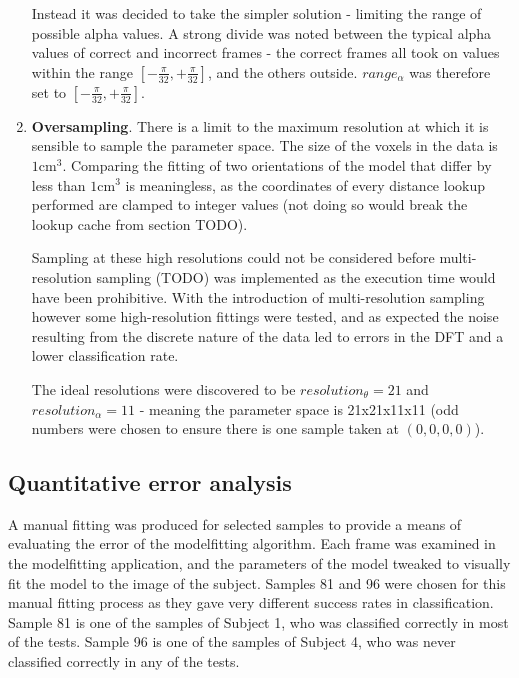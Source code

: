\begin{enumerate}
		Instead it was decided to take the simpler solution - limiting the range of possible alpha values.
		A strong divide was noted between the typical alpha values of correct and incorrect frames - the correct frames all took on
		values within the range $\left[ -\frac{\pi}{32}, +\frac{\pi}{32}\right]$, and the others outside.
		$range_\alpha$ was therefore set to $\left[ -\frac{\pi}{32}, +\frac{\pi}{32}\right]$.
	
	\item \textbf{Oversampling}.
		There is a limit to the maximum resolution at which it is sensible to sample the parameter space.
		The size of the voxels in the data is $1\text{cm}^3$.
		Comparing the fitting of two orientations of the model that differ by less than $1\text{cm}^3$ is meaningless,
		as the coordinates of every distance lookup performed are clamped to integer values (not doing so would break
		the lookup cache from section TODO).
		
		Sampling at these high resolutions could not be considered before multi-resolution sampling (TODO) was implemented
		as the execution time would have been prohibitive.
		With the introduction of multi-resolution sampling however some high-resolution fittings were tested, and as expected
		the noise resulting from the discrete nature of the data led to errors in the DFT and a lower classification rate.
		
		The ideal resolutions were discovered to be $resolution_\theta = 21$ and $resolution_\alpha = 11$ - meaning the
		parameter space is 21x21x11x11 (odd numbers were chosen to ensure there is one sample taken at $(0, 0, 0, 0)$).
\end{enumerate}


\subsection{Quantitative error analysis}
\label{Modelfitting:ErrorAnalysis}

A manual fitting was produced for selected samples to provide a means of evaluating the error of the modelfitting algorithm.
Each frame was examined in the modelfitting application, and the parameters of the model tweaked to visually fit the model to the image of the subject.
Samples 81 and 96 were chosen for this manual fitting process as they gave very different success rates in classification.
Sample 81 is one of the samples of Subject 1, who was classified correctly in most of the tests.
Sample 96 is one of the samples of Subject 4, who was never classified correctly in any of the tests.

